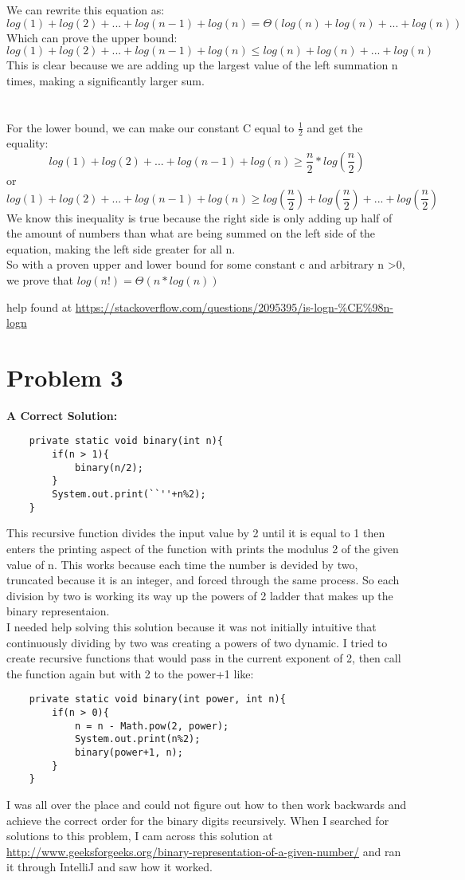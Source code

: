 \documentclass[10pt, draftclsnofoot, onecolumn]{IEEEtran}
\begin{document}
We can rewrite this equation as:
\[ log(1) + log(2) + ... + log(n-1) + log(n) = \Theta( log(n) + log(n) + ... + log(n) ) \]
Which can prove the upper bound:
\[ log(1) + log(2) + ... + log(n-1) + log(n) \leq log(n) + log(n) + ... + log(n)  \]
This is clear because we are adding up the largest value of the left summation n times, making a significantly larger sum.\\ \\ \\
For the lower bound, we can make our constant C equal to \(\frac{1}{2}\) and get the equality:
\[ log(1) + log(2) + ... + log(n-1) + log(n) \geq \frac{n}{2}*log(\frac{n}{2}) \]
or
\[ log(1) + log(2) + ... + log(n-1) + log(n) \geq  log(\frac{n}{2}) + log(\frac{n}{2}) + ... + log(\frac{n}{2}) \]
We know this inequality is true because the right side is only adding up half of the amount of numbers than what are being summed on the left side of the equation, making the left side greater for all n.\\
So with a proven upper and lower bound for some constant c and arbitrary n \textgreater  0, we prove that \(log(n!) = \Theta(n*log(n))\)

help found at \url{https://stackoverflow.com/questions/2095395/is-logn-%CE%98n-logn}

\newpage
\section{Problem 3}
\textbf{A Correct Solution:}
\begin{lstlisting}
    private static void binary(int n){
        if(n > 1){
            binary(n/2);
        }
        System.out.print(``''+n%2);
    }
\end{lstlisting}

This recursive function divides the input value by 2 until it is equal to 1 then enters the printing aspect of the function with prints the modulus 2 of the given value of n. This works because each time the number is devided by two, truncated because it is an integer, and forced through the same process. So each division by two is working its way up the powers of 2 ladder that makes up the binary representaion.\\

I needed help solving this solution because it was not initially intuitive that continuously dividing by two was creating a powers of two dynamic. I tried to create recursive functions that would pass in the current exponent of 2, then call the function again but with 2 to the power+1 like:
\begin{lstlisting}
    private static void binary(int power, int n){
        if(n > 0){
            n = n - Math.pow(2, power);
            System.out.print(n%2);
            binary(power+1, n);
        }
    }
\end{lstlisting}
 I was all over the place and could not figure out how to then work backwards and achieve the correct order for the binary digits recursively. When I searched for solutions to this problem, I cam across this solution at \url{http://www.geeksforgeeks.org/binary-representation-of-a-given-number/} and ran it through IntelliJ and saw how it worked.
\end{document}
